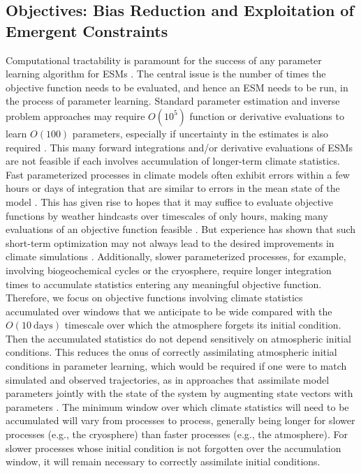 \documentclass[draft]{agujournal}
\begin{document}
\subsection{Objectives: Bias Reduction and Exploitation of Emergent Constraints}

Computational tractability is paramount for the success of any parameter learning algorithm for ESMs \citep[e.g.,][]{Annan07a,Jackson08a,Neelin10a,Solonen12a}. The central issue is the number of times the objective function needs to be evaluated, and hence an ESM needs to be run, in the process of parameter learning. Standard parameter estimation and inverse problem approaches may require $O(10^5)$ function or  derivative evaluations to learn $O(100)$ parameters, especially if uncertainty in the estimates is also required \citep{Cotter13a}. This many forward integrations and/or derivative evaluations of ESMs are not feasible if each involves accumulation of longer-term climate statistics. Fast parameterized processes in climate models often exhibit errors within a few hours or days of integration that are similar to errors in the mean state of the model \citep{Phillips04a,Rodwell07a,Xie12a,Ma13a,Klocke14a}. This has given rise to hopes that it may suffice to evaluate objective functions by weather hindcasts over timescales of only hours, making many evaluations of an objective function feasible \citep{Aksoy06a,Ruiz13a,Wan14a}. But experience has shown that such short-term optimization may not always lead to the desired improvements in climate simulations \citep{Schirber13a}. Additionally, slower parameterized processes, for example, involving biogeochemical cycles or the cryosphere, require longer integration times to accumulate statistics entering any meaningful objective function. Therefore, we focus on objective functions involving climate statistics accumulated over windows that we anticipate to be wide compared with the $O(10~\mathrm{days})$ timescale over which the atmosphere forgets its initial condition. Then the accumulated statistics do not depend sensitively on atmospheric initial conditions. This reduces the onus of correctly assimilating atmospheric initial conditions in parameter learning, which would be required if one were to match simulated and observed trajectories, as in approaches that assimilate model parameters jointly with the state of the system by augmenting state vectors with parameters \citep[e.g.,][]{Dee05a,Aksoy06a,Anderson09a}. The minimum window over which climate statistics will need to be accumulated will vary from processes to process, generally being longer for slower processes (e.g., the cryosphere) than faster processes (e.g., the atmosphere). For slower processes whose initial condition is not forgotten over the accumulation window, it will remain necessary to correctly assimilate initial conditions. 
\end{document}
